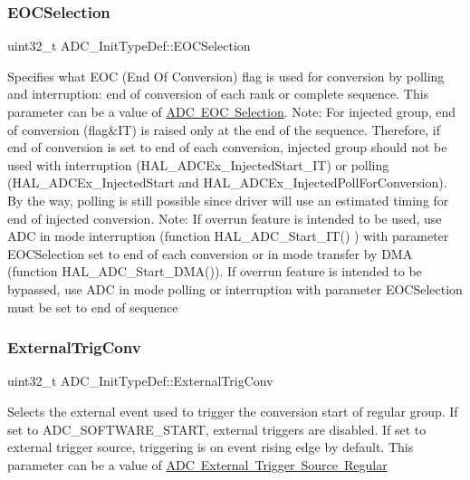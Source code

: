 \subsubsection{\texorpdfstring{EOCSelection}{EOCSelection}}
{\footnotesize\ttfamily uint32\+\_\+t A\+D\+C\+\_\+\+Init\+Type\+Def\+::\+E\+O\+C\+Selection}

Specifies what E\+OC (End Of Conversion) flag is used for conversion by polling and interruption\+: end of conversion of each rank or complete sequence. This parameter can be a value of \mbox{\hyperlink{group___a_d_c___e_o_c_selection}{A\+DC E\+OC Selection}}. Note\+: For injected group, end of conversion (flag\&IT) is raised only at the end of the sequence. Therefore, if end of conversion is set to end of each conversion, injected group should not be used with interruption (H\+A\+L\+\_\+\+A\+D\+C\+Ex\+\_\+\+Injected\+Start\+\_\+\+IT) or polling (H\+A\+L\+\_\+\+A\+D\+C\+Ex\+\_\+\+Injected\+Start and H\+A\+L\+\_\+\+A\+D\+C\+Ex\+\_\+\+Injected\+Poll\+For\+Conversion). By the way, polling is still possible since driver will use an estimated timing for end of injected conversion. Note\+: If overrun feature is intended to be used, use A\+DC in mode \textquotesingle{}interruption\textquotesingle{} (function H\+A\+L\+\_\+\+A\+D\+C\+\_\+\+Start\+\_\+\+I\+T() ) with parameter E\+O\+C\+Selection set to end of each conversion or in mode \textquotesingle{}transfer by D\+MA\textquotesingle{} (function H\+A\+L\+\_\+\+A\+D\+C\+\_\+\+Start\+\_\+\+D\+M\+A()). If overrun feature is intended to be bypassed, use A\+DC in mode \textquotesingle{}polling\textquotesingle{} or \textquotesingle{}interruption\textquotesingle{} with parameter E\+O\+C\+Selection must be set to end of sequence \mbox{\label{struct_a_d_c___init_type_def_a47aba277f9d8f3c5774983de4ce9455b}} 
\subsubsection{\texorpdfstring{ExternalTrigConv}{ExternalTrigConv}}
{\footnotesize\ttfamily uint32\+\_\+t A\+D\+C\+\_\+\+Init\+Type\+Def\+::\+External\+Trig\+Conv}

Selects the external event used to trigger the conversion start of regular group. If set to A\+D\+C\+\_\+\+S\+O\+F\+T\+W\+A\+R\+E\+\_\+\+S\+T\+A\+RT, external triggers are disabled. If set to external trigger source, triggering is on event rising edge by default. This parameter can be a value of \mbox{\hyperlink{group___a_d_c___external__trigger___source___regular}{A\+DC External Trigger Source Regular}} \mbox{\label{struct_a_d_c___init_type_def_aeed14631d5f1d118a252ea24edd68ede}} 
